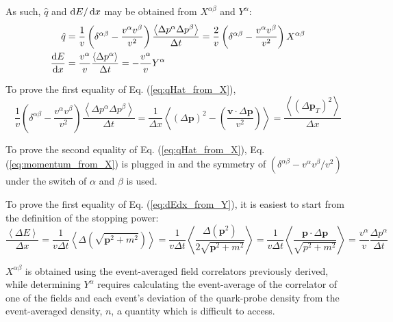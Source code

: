 As such, $\hat{q}$ and $\mathop{}\!\mathrm{d} E / \mathop{}\!\mathrm{d} x$ may be obtained from $X^{\alpha\beta}$ and $Y^\alpha$:
\begin{subequations}
\begin{align}
	\hat{q} & = \frac{1}{v} \left(\delta^{\alpha \beta} - \frac{v^\alpha v^\beta}{v^2} \right) \frac{\left< \Delta p^\alpha \Delta p^\beta \right>}{\Delta t} = \frac{2}{v} \left(\delta^{\alpha \beta} - \frac{v^\alpha v^\beta}{v^2} \right) X^{\alpha\beta} \label{eq:qHat_from_X} \\	
	\frac{\mathop{}\!\mathrm{d} E}{\mathop{}\!\mathrm{d} x} &= \frac{v^\alpha}{v} \frac{\left< \Delta p^\alpha \right>}{\Delta t} = - \frac{v^\alpha}{v} Y^\alpha \label{eq:dEdx_from_Y}
\end{align}
\label{eq:collision_from_tensors_v0}
\end{subequations}

To prove the first equality of Eq. (\ref{eq:qHat_from_X}),
\begin{equation*}
\frac{1}{v} \left(\delta^{\alpha \beta} - \frac{v^\alpha v^\beta}{v^2} \right) \frac{\left< \Delta p^\alpha \Delta p^\beta \right>}{\Delta t} = \frac{1}{\Delta x} \left< (\Delta \mathbf{p})^2 - \left(\frac{\mathbf{v}\cdot \Delta \mathbf{p}}{v^2} \right)\right> = \frac{\left<(\Delta{\mathbf{p}_T})^2\right>}{\Delta x}
\end{equation*}

To prove the second equality of Eq. (\ref{eq:qHat_from_X}), Eq. (\ref{eq:momentum_from_X}) is plugged in and the symmetry of $(\delta^{\alpha \beta} - v^\alpha v^\beta/v^2)$ under the switch of $\alpha$ and $\beta$ is used.

To prove the first equality of Eq. (\ref{eq:dEdx_from_Y}), it is easiest to start from the definition of the stopping power:
\begin{equation*}
	\frac{\left< \Delta E\right>}{\Delta x}  = \frac{1}{v\Delta t} \left<  \Delta (\sqrt{\mathbf{p}^2+m^2})\right> = \frac{1}{v\Delta t} \left<  \frac{\Delta (\mathbf{p}^2)}{ 2\sqrt{\mathbf{p}^2+m^2}}\right> 
	 = \frac{1}{v\Delta t} \left<  \frac{\mathbf{p} \cdot \Delta \mathbf{p}}{ \sqrt{p^2+m^2}}\right> = \frac{v^\alpha}{v} \frac{\Delta p^\alpha}{\Delta t}
\end{equation*}

$X^{\alpha\beta}$ is obtained using the event-averaged field correlators previously derived, while determining $Y^\alpha$ requires calculating the event-average of the correlator of one of the fields and each event's deviation of the quark-probe density from the event-averaged density, $n$, a quantity which is difficult to access.

